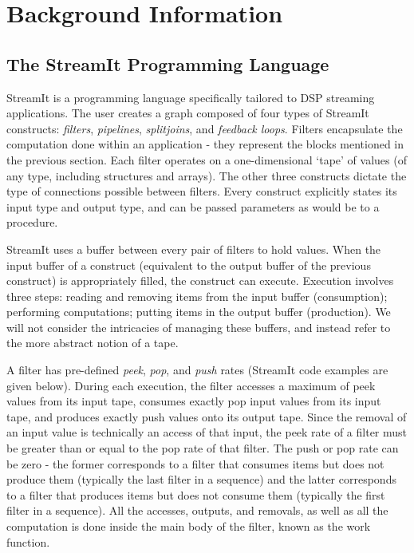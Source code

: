 \section{Background Information}

\subsection{The StreamIt Programming Language}

    StreamIt is a programming language specifically tailored to DSP
streaming applications. The user creates a graph composed of four
types of StreamIt constructs: \textit{filters},
\textit{pipelines}, \textit{splitjoins}, and \textit{feedback
loops}. Filters encapsulate the computation done within an
application - they represent the blocks mentioned in the previous
section. Each filter operates on a one-dimensional `tape' of
values (of any type, including structures and arrays).  The other
three constructs dictate the type of connections possible between
filters. Every construct explicitly states its input type and
output type, and can be passed parameters as would be to a
procedure.

    StreamIt uses a buffer between every pair of filters to
hold values. When the input buffer of a construct (equivalent to
the output buffer of the previous construct) is appropriately
filled, the construct can execute. Execution involves three steps:
reading and removing items from the input buffer (consumption);
performing computations; putting items in the output buffer
(production). We will not consider the intricacies of managing
these buffers, and instead refer to the more abstract notion of a
tape.

    A filter has pre-defined \textit{peek}, \textit{pop}, and
\textit{push} rates (StreamIt code examples are given below).
During each execution, the filter accesses a maximum of peek
values from its input tape, consumes exactly pop input values from
its input tape, and produces exactly push values onto its output
tape. Since the removal of an input value is technically an access
of that input, the peek rate of a filter must be greater than or
equal to the pop rate of that filter. The push or pop rate can be
zero - the former corresponds to a filter that consumes items but
does not produce them (typically the last filter in a sequence)
and the latter corresponds to a filter that produces items but
does not consume them (typically the first filter in a sequence).
All the accesses, outputs, and removals, as well as all the
computation is done inside the main body of the filter, known as
the work function.

